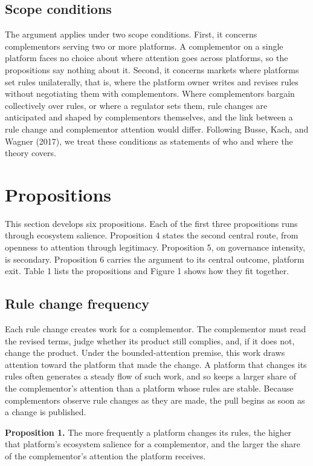 \documentclass[12pt]{article}
\begin{document}
\subsection{Scope conditions}

The argument applies under two scope conditions. First, it concerns complementors serving two or more platforms. A complementor on a single platform faces no choice about where attention goes across platforms, so the propositions say nothing about it. Second, it concerns markets where platforms set rules unilaterally, that is, where the platform owner writes and revises rules without negotiating them with complementors. Where complementors bargain collectively over rules, or where a regulator sets them, rule changes are anticipated and shaped by complementors themselves, and the link between a rule change and complementor attention would differ. Following Busse, Kach, and Wagner (2017), we treat these conditions as statements of who and where the theory covers.

\section{Propositions}

This section develops six propositions. Each of the first three propositions runs through ecosystem salience. Proposition 4 states the second central route, from openness to attention through legitimacy. Proposition 5, on governance intensity, is secondary. Proposition 6 carries the argument to its central outcome, platform exit. Table 1 lists the propositions and Figure 1 shows how they fit together.

\subsection{Rule change frequency}

Each rule change creates work for a complementor. The complementor must read the revised terms, judge whether its product still complies, and, if it does not, change the product. Under the bounded-attention premise, this work draws attention toward the platform that made the change. A platform that changes its rules often generates a steady flow of such work, and so keeps a larger share of the complementor's attention than a platform whose rules are stable. Because complementors observe rule changes as they are made, the pull begins as soon as a change is published.

\textbf{Proposition 1.} The more frequently a platform changes its rules, the higher that platform's ecosystem salience for a complementor, and the larger the share of the complementor's attention the platform receives.
\end{document}
